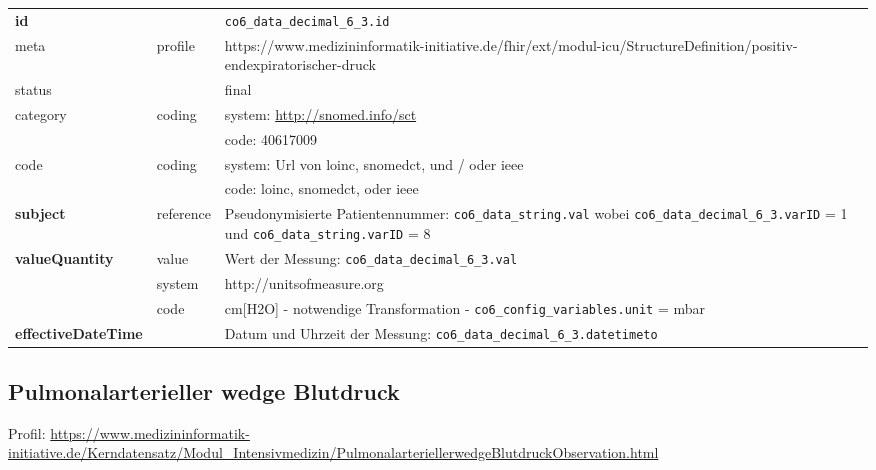 \begin{longtable}{|l|l|p{7.5cm}|}
        \hline
        \rowcolor{lightgray} \multicolumn{3}{|l|}{Data Mapping (inhaltlich)} \\ \hline
        \textbf{id} &  & \texttt{co6\_data\_decimal\_6\_3.id} \\ \hline
	meta & profile & https://www.medizininformatik-initiative.de/fhir/ext/modul-icu/StructureDefinition/positiv-endexpiratorischer-druck \\ \hline 
	status &  & final   \\ \hline 
	category & coding & system: \url{http://snomed.info/sct} \\
\cline{3-3}
	& & code: 40617009 \\ \hline
	code & coding & system: Url von \ac{loinc}, \ac{snomedct}, und / oder \ac{ieee} \\ 
	\cline{3-3} 
	 &  & code: \ac{loinc}, \ac{snomedct}, oder \ac{ieee} \\ \hline
	 \textbf{subject} & reference & Pseudonymisierte Patientennummer: \texttt{co6\_data\_string.val} wobei \texttt{co6\_data\_decimal\_6\_3.varID} = 1 und \texttt{co6\_data\_string.varID} = 8 \\ \hline
	 \textbf{valueQuantity}  & value & Wert der Messung: \texttt{co6\_data\_decimal\_6\_3.val} \\
        \cline{2-3}
         & system & http://unitsofmeasure.org \\
         \cline{2-3}
         & code & cm[H2O] - notwendige Transformation - \texttt{co6\_config\_variables.unit} = mbar \\ \hline
     \textbf{effectiveDateTime}  & & Datum und Uhrzeit der Messung: \texttt{co6\_data\_decimal\_6\_3.datetimeto} \\ \hline
\end{longtable}


\subsection{Pulmonalarterieller wedge Blutdruck} 
Profil: \url{https://www.medizininformatik-initiative.de/Kerndatensatz/Modul_Intensivmedizin/PulmonalarteriellerwedgeBlutdruckObservation.html}

